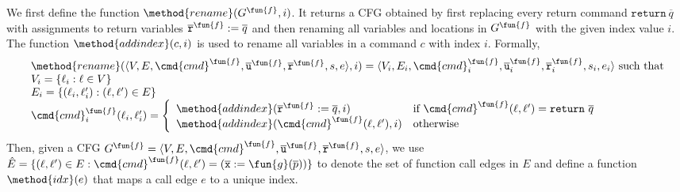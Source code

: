We first define the function $\method{rename}(G^\fun{f},i)$.
It returns a CFG obtained by first replacing every return command
$\mathtt{return}\ \overline{q}$ with assignments to return variables
$\overline{\texttt{r}}^\fun{f} := \overline{q}$ and then renaming all variables
and locations in $G^\fun{f}$ with the given index value $i$.
The function $\method{addindex}(c, i)$ is used to rename all variables in a
command $c$ with index $i$.
Formally,
\[
\begin{array}{l}
\method{rename}(\langle V, E,\cmd{cmd}^\fun{f},\overline{\texttt{u}}^\fun{f},
\overline{\texttt{r}}^\fun{f},s,e \rangle,i)
= \langle V_i, E_i,\cmd{cmd}_i^\fun{f},\overline{\texttt{u}}_i^\fun{f},
\overline{\texttt{r}}_i^\fun{f},s_i,e_i \rangle \text{ such that}\\

V_i = \{\ell_i:\ell \in V\} \\

E_i = \{(\ell_i,\ell'_i): (\ell,\ell') \in E\} \\

\cmd{cmd}_i^\fun{f}(\ell_i,\ell'_i) =
  \left\{
  \begin{array}{ll}
   \method{addindex}(\overline{\texttt{r}}^\fun{f}:=\overline{q}, i) &
     \text{if }\cmd{cmd}^\fun{f}(\ell,\ell')=\mathtt{return}\ \overline{q} \\
   \method{addindex}(\cmd{cmd}^\fun{f}(\ell,\ell'), i) &
     \text{otherwise}
  \end{array}
  \right.
\end{array}
\]
Then, given a CFG $G^\fun{f}=\langle V, E,\cmd{cmd}^\fun{f},
\overline{\texttt{u}}^\fun{f}, \overline{\texttt{r}}^\fun{f},s,e \rangle$,
we use $\hat{E} =\{(\ell, \ell')\in E: \cmd{cmd}^\fun{f} (\ell,\ell')=(\overline{\texttt{x}}:=\fun{g}(\overline{p}))\}$ to denote the set of function call edges in $E$ and define a function $\method{idx}(e)$ that maps a call edge $e$ to a unique index.

